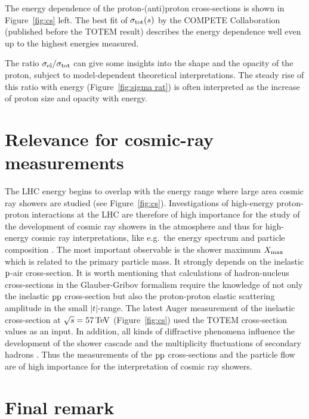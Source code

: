 \documentclass[doublecol]{epl/epl2}
\def\un#1{\,{\rm #1}}
\begin{document}
The energy dependence of the proton-(anti)proton cross-sections is shown in Figure~\ref{fig:cs} left. The best fit of $\sigma_{\rm tot}(s)$ by the COMPETE Collaboration \cite{compete} (published before the TOTEM result) describes the energy dependence well even up to the highest energies measured.

The ratio $\sigma_{\rm el}/\sigma_{\rm tot}$ can give some insights into the shape and the opacity of the proton, subject to model-dependent theoretical interpretations. The steady rise of this ratio with energy (Figure~\ref{fig:sigma rat}) is often interpreted as the increase of proton size and opacity with energy. 

\FigRatio

\section{Relevance for cosmic-ray measurements}

The LHC energy begins to overlap with the energy range where large area cosmic ray showers are studied (see Figure~\ref{fig:cs}). Investigations of high-energy proton-proton interactions at the LHC are therefore of high importance for the study of the development of cosmic ray showers in the atmosphere and thus for high-energy cosmic ray interpretations, like e.g.~the energy spectrum and particle composition \cite{nagano}.  The most important observable is the shower maximum $X_{\rm max}$ which is related to the primary particle mass. It strongly depends on the inelastic $\rm p$-air cross-section. It is worth mentioning that calculations of hadron-nucleus cross-sections in the Glauber-Gribov formalism \cite{glauber,gribov} require the knowledge of not only the inelastic $\rm pp$ cross-section but also the proton-proton elastic scattering amplitude in the small $|t|$-range. The latest Auger measurement of the inelastic cross-section at $\sqrt s = 57\un{TeV}$ \cite{auger} (Figure~\ref{fig:cs}) used the TOTEM cross-section values as an input. In addition, all kinds of diffractive phenomena influence the development of the shower cascade and the multiplicity fluctuations of secondary hadrons \cite{enterria}. Thus the measurements of the $\rm pp$ cross-sections and the particle flow are of high importance for the interpretation of cosmic ray showers.

\section{Final remark}
\end{document}
